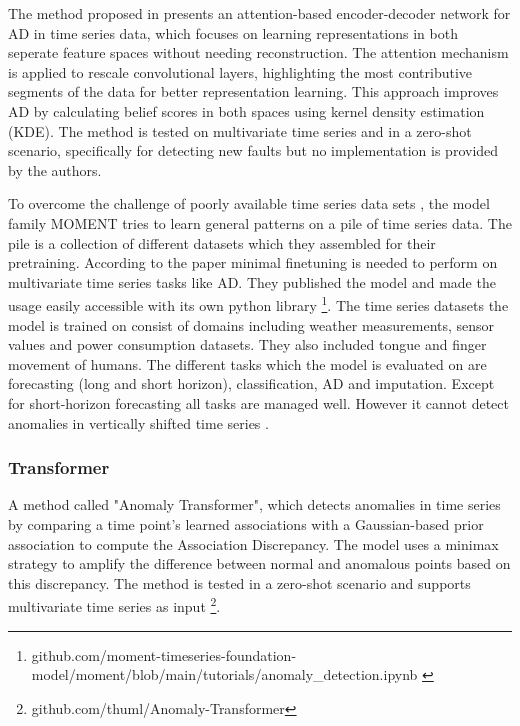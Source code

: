 %
The method proposed in \cite{wang_attention-based_2022} presents an attention-based encoder-decoder network for AD in time series data, which focuses on learning representations in both seperate feature spaces without needing reconstruction. The attention mechanism is applied to rescale convolutional layers, highlighting the most contributive segments of the data for better representation learning. This approach improves AD by calculating belief scores in both spaces using kernel density estimation (KDE). The method is tested on multivariate time series and in a zero-shot scenario, specifically for detecting new faults but no implementation is provided by the authors.

To overcome the challenge of poorly available time series data sets \cite{ma_survey_2023}, the model family MOMENT tries to learn general patterns on a pile of time series data. The pile is a collection of different datasets which they assembled for their pretraining. According to the paper minimal finetuning is needed to perform on multivariate time series tasks like AD. They published the model and made the usage easily accessible with its own python library \footnote{\fussy\tiny github.com/moment-timeseries-foundation-model/moment/blob/main/tutorials/anomaly\_detection.ipynb \label{foot_moment}}. The time series datasets the model is trained on consist of domains including weather measurements, sensor values and power consumption datasets. They also included tongue and finger movement of humans. The different tasks which the model is evaluated on are forecasting (long and short horizon), classification, AD and imputation. Except for short-horizon forecasting all tasks are managed well. However it cannot detect anomalies in vertically shifted time series \cite{goswami_moment_2024}.


\subsubsection{Transformer}

A method called "Anomaly Transformer", which detects anomalies in time series by comparing a time point’s learned associations with a Gaussian-based prior association to compute the Association Discrepancy. The model uses a minimax strategy to amplify the difference between normal and anomalous points based on this discrepancy. The method is tested in a zero-shot scenario and supports multivariate time series as input \cite{xu_anomaly_2022} \footnote{\fussy\tiny github.com/thuml/Anomaly-Transformer}.

